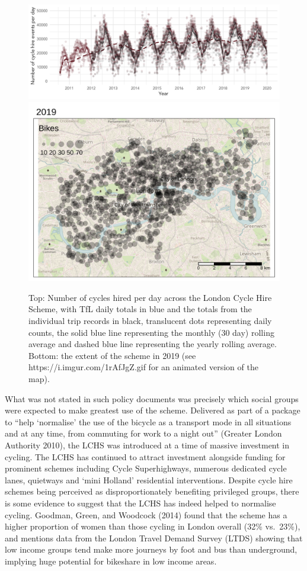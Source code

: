 \documentclass[]{article}
\begin{document}
\begin{figure}

{\centering \includegraphics[width=0.7\linewidth]{figures/cycle-hire-chart-daily} \includegraphics[width=0.7\linewidth]{figures/overview-2019} 

}

\caption{Top: Number of cycles hired per day across the London Cycle Hire Scheme, with TfL daily totals in blue and the totals from the individual trip records in black, translucent dots representing daily counts, the solid blue line representing the monthly (30 day) rolling average and dashed blue line representing the yearly rolling average. Bottom: the extent of the scheme in 2019 (see https://i.imgur.com/1rAfJgZ.gif for an animated version of the map).}\label{fig:cycle-hire-chart-daily}
\end{figure}

What was not stated in such policy documents was precisely which social groups were expected to make greatest use of the scheme.
Delivered as part of a package to ``help `normalise' the use of the bicycle as a transport mode in all situations and at any time, from commuting for work to a night out'' (Greater London Authority 2010), the LCHS was introduced at a time of massive investment in cycling.
The LCHS has continued to attract investment alongside funding for prominent schemes including Cycle Superhighways,
numerous dedicated cycle lanes,
quietways
and `mini Holland' residential interventions.
Despite cycle hire schemes being perceived as disproportionately benefiting privileged groups, there is some evidence to suggest that the LCHS has indeed helped to normalise cycling.
Goodman, Green, and Woodcock (2014) found that the scheme has a higher proportion of women than those cycling in London overall (32\% vs.~23\%), and mentions data from the London Travel Demand Survey (LTDS) showing that low income groups tend make more journeys by foot and bus than underground, implying huge potential for bikeshare in low income areas.
\end{document}
